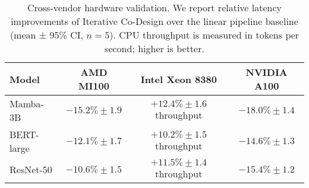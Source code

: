 \begin{table}[hbt!]
    \centering
    \caption{Cross-vendor hardware validation. We report relative latency improvements of Iterative Co-Design over the linear pipeline baseline (mean ± 95\% CI, $n=5$). CPU throughput is measured in tokens per second; higher is better.}
    \label{tab:cross_vendor}
    \begin{tabular}{l c c c}
        \toprule
        \textbf{Model} & \textbf{AMD MI100} & \textbf{Intel Xeon 8380} & \textbf{NVIDIA A100} \\
        \midrule
        Mamba-3B & $-15.2\% \pm 1.9$ & $+12.4\% \pm 1.6$ throughput & $-18.0\% \pm 1.4$ \\
        BERT-large & $-12.1\% \pm 1.7$ & $+10.2\% \pm 1.5$ throughput & $-14.6\% \pm 1.3$ \\
        ResNet-50 & $-10.6\% \pm 1.5$ & $+11.5\% \pm 1.4$ throughput & $-15.4\% \pm 1.2$ \\
        \bottomrule
    \end{tabular}
\end{table}
